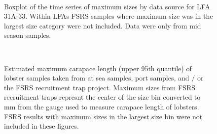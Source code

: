 \documentclass[11pt]{article}
\newcommand{\D}{.}
\newcommand{\e}{/backup/bio_data/bio.lobster/figures/} %
\begin{document}
\begin{figure}
        \centering
         \\
                     \caption{Boxplot of the time series of maximum sizes by data source for LFA 31A-33. Within LFAs FSRS samples where maximum size was in the largest size category were not included. Data were only from mid season samples.}
        \end{figure}



\begin{landscape}
\begin{figure}
        \centering
         \\
                    
                    \caption{Estimated maximum carapace length (upper 95th quantile) of lobster samples taken from at sea samples, port samples, and / or the FSRS recruitment trap project. Maximum sizes from FSRS recruitment traps represnt the center of the size bin converted to mm from the gauge used to measure carapace length of lobsters. FSRS results with maximum sizes in the largest size bin were not included in these figures.}
        \end{figure}

\begin{figure}
        \centering
         \\
                    

\end{figure}
\end{landscape}
\end{document}
